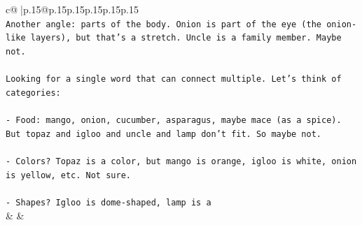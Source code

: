 \documentclass{article}
\begin{document}
{\begin{supertabular}{c@{$\;$}|p{.15\linewidth}@{}p{.15\linewidth}p{.15\linewidth}p{.15\linewidth}p{.15\linewidth}p{.15\linewidth}}
{{{\\ 
\texttt{Another angle: parts of the body. Onion is part of the eye (the onion{-}like layers), but that's a stretch. Uncle is a family member. Maybe not.} \\
\\ 
\texttt{Looking for a single word that can connect multiple. Let's think of categories:} \\
\\ 
\texttt{{-} Food: mango, onion, cucumber, asparagus, maybe mace (as a spice). But topaz and igloo and uncle and lamp don't fit. So maybe not.} \\
\\ 
\texttt{{-} Colors? Topaz is a color, but mango is orange, igloo is white, onion is yellow, etc. Not sure.} \\
\\ 
\texttt{{-} Shapes? Igloo is dome{-}shaped, lamp is a} \\
            }
        }
    }
    & & \\ \\


\end{supertabular}}
\end{document}

